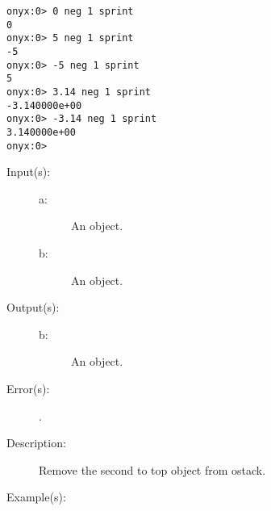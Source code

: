 \begin{description}
\begin{description}
\begin{verbatim}
onyx:0> 0 neg 1 sprint
0
onyx:0> 5 neg 1 sprint
-5
onyx:0> -5 neg 1 sprint
5
onyx:0> 3.14 neg 1 sprint
-3.140000e+00
onyx:0> -3.14 neg 1 sprint
3.140000e+00
onyx:0>
		\end{verbatim}
	\end{description}
\label{systemdict:nip}
\item[{\onyxop{a b}{nip}{b}}: ]
	\begin{description}\item[]
	\item[Input(s): ]
		\begin{description}\item[]
		\item[a: ]
			An object.
		\item[b: ]
			An object.
		\end{description}
	\item[Output(s): ]
		\begin{description}\item[]
		\item[b: ]
			An object.
		\end{description}
	\item[Error(s): ]
		\begin{description}\item[]
		\item[.]
		\end{description}
	\item[Description: ]
		Remove the second to top object from ostack.
	\item[Example(s): ]\begin{verbatim}


\end{verbatim}
\end{description}
\end{description}
